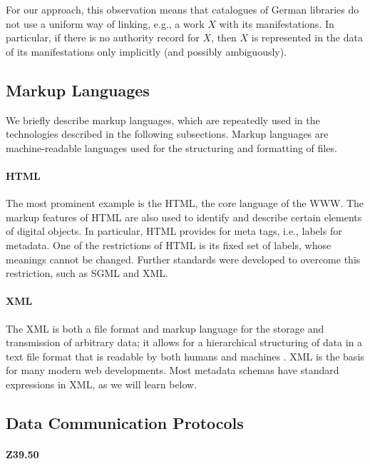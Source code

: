 For our approach, this observation means that catalogues of German libraries
do not use a uniform way of linking, e.g., a work $X$ with its manifestations.
In particular, if there is no authority record for $X$,
then $X$ is represented in the data of its manifestations only implicitly 
(and possibly ambiguously).

\subsection{Markup Languages}
\label{subsec:markup}

We briefly describe markup languages, which are repeatedly used in the technologies
described in the following subsections.
Markup languages are machine-readable languages used for the structuring and formatting of files.

\paragraph{HTML}
The most prominent example is the \gls{HTML}, the core language of the \gls{WWW}.
The markup features of HTML are also used to identify and describe certain elements of digital objects.
In particular, HTML provides for meta tags, i.e., labels for metadata.
One of the restrictions of HTML is its fixed set of labels, whose meanings cannot be changed.
Further standards were developed to overcome this restriction,
such as SGML and XML.

\paragraph{XML}
%
The \gls{XML} is both a file format and markup language for the storage and transmission of arbitrary data;
it allows for a hierarchical structuring of data in a text file format that is readable by both humans and machines
\autocite{WikiXML}.
XML is the basis for many modern web developments.
Most metadata schemas have standard expressions in XML, as we will learn below.

\subsection{Data Communication Protocols}
\label{subsec:data_comm_prot}

\paragraph{Z39.50}

